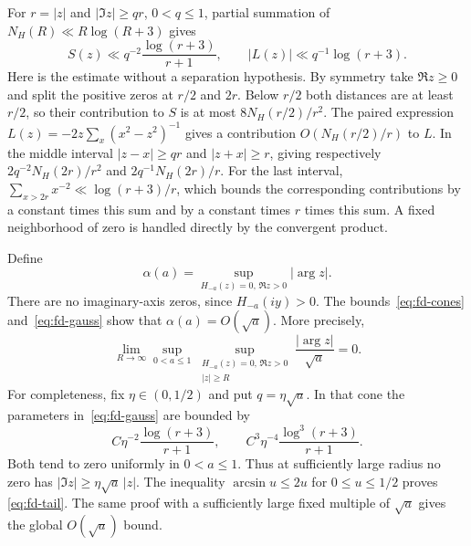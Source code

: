 For $r=|z|$ and $|\Im z|\ge qr$, $0<q\le1$, partial summation of
$N_H(R)\ll R\log(R+3)$ gives
\begin{equation}\label{eq:fd-cones}
 S(z)\ll q^{-2}\frac{\log(r+3)}{r+1},\qquad
 |L(z)|\ll q^{-1}\log(r+3).
\end{equation}
Here is the estimate without a separation hypothesis.  By symmetry take
$\Re z\ge0$ and split the positive zeros at $r/2$ and $2r$.
Below $r/2$ both distances are at least $r/2$, so their contribution
to $S$ is at most $8N_H(r/2)/r^2$.  The paired expression
$L(z)=-2z\sum_x(x^2-z^2)^{-1}$ gives a contribution
$O(N_H(r/2)/r)$ to $L$.  In the middle interval
$|z-x|\ge qr$ and $|z+x|\ge r$, giving respectively
$2q^{-2}N_H(2r)/r^2$ and $2q^{-1}N_H(2r)/r$.
For the last interval, $\sum_{x>2r}x^{-2}\ll\log(r+3)/r$,
which bounds the corresponding contributions by a constant times this
sum and by a constant times $r$ times this sum.  A fixed neighborhood
of zero is handled directly by the convergent product.

Define
\[
 \alpha(a)=\sup_{H_{-a}(z)=0,\,\Re z>0}|\arg z|.
\]
There are no imaginary-axis zeros, since $H_{-a}(iy)>0$.
The bounds~\eqref{eq:fd-cones} and~\eqref{eq:fd-gauss} show that
$\alpha(a)=O(\sqrt a)$.  More precisely,
\begin{equation}\label{eq:fd-tail}
 \lim_{R\to\infty}\sup_{0<a\le1}
 \sup_{\substack{H_{-a}(z)=0,\,\Re z>0\\|z|\ge R}}
            \frac{|\arg z|}{\sqrt a}=0.
\end{equation}
For completeness, fix $\eta\in(0,1/2)$ and put $q=\eta\sqrt a$.
In that cone the parameters in~\eqref{eq:fd-gauss} are bounded by
\[
 C\eta^{-2}\frac{\log(r+3)}{r+1},\qquad
 C^3\eta^{-4}\frac{\log^3(r+3)}{r+1}.
\]
Both tend to zero uniformly in $0<a\le1$.  Thus at sufficiently large
radius no zero has $|\Im z|\ge\eta\sqrt a\,|z|$.
The inequality $\arcsin u\le2u$ for $0\le u\le1/2$ proves
\eqref{eq:fd-tail}.  The same proof with a sufficiently large fixed
multiple of $\sqrt a$ gives the global $O(\sqrt a)$ bound.

